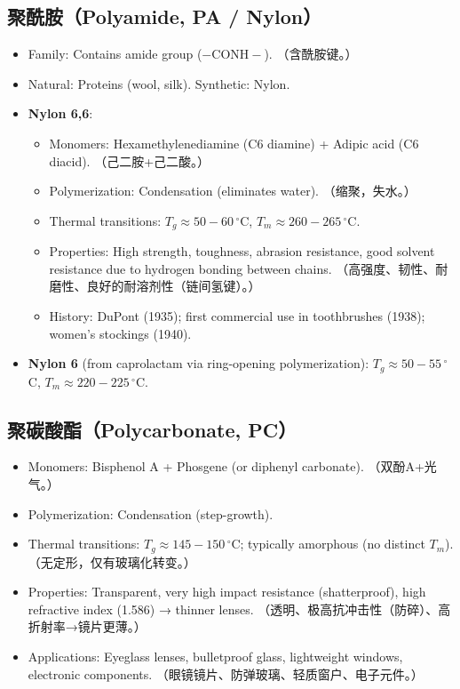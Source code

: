 \documentclass[12pt,a4paper]{ctexart}
\begin{document}
\subsection{聚酰胺（Polyamide, PA / Nylon）}
\begin{itemize}[leftmargin=*]
    \item Family: Contains amide group ($-\mathrm{CONH}-$). （含酰胺键。）
    \item Natural: Proteins (wool, silk).  Synthetic: Nylon.
    \item \textbf{Nylon 6,6}:
        \begin{itemize}
            \item Monomers: Hexamethylenediamine (C6 diamine) + Adipic acid (C6 diacid). （己二胺+己二酸。）
            \item Polymerization: Condensation (eliminates water). （缩聚，失水。）
            \item Thermal transitions: $T_g \approx 50-60\,^\circ$C, $T_m \approx 260-265\,^\circ$C.
            \item Properties: High strength, toughness, abrasion resistance, good solvent resistance due to hydrogen bonding between chains. （高强度、韧性、耐磨性、良好的耐溶剂性（链间氢键）。）
            \item History: DuPont (1935); first commercial use in toothbrushes (1938); women's stockings (1940).
        \end{itemize}
    \item \textbf{Nylon 6} (from caprolactam via ring-opening polymerization): $T_g \approx 50-55\,^\circ$C, $T_m \approx 220-225\,^\circ$C.
\end{itemize}

\subsection{聚碳酸酯（Polycarbonate, PC）}
\begin{itemize}[leftmargin=*]
    \item Monomers: Bisphenol A + Phosgene (or diphenyl carbonate). （双酚A+光气。）
    \item Polymerization: Condensation (step-growth).
    \item Thermal transitions: $T_g \approx 145-150\,^\circ$C; typically amorphous (no distinct $T_m$). （无定形，仅有玻璃化转变。）
    \item Properties: Transparent, very high impact resistance (shatterproof), high refractive index (1.586) → thinner lenses. （透明、极高抗冲击性（防碎）、高折射率→镜片更薄。）
    \item Applications: Eyeglass lenses, bulletproof glass, lightweight windows, electronic components. （眼镜镜片、防弹玻璃、轻质窗户、电子元件。）
\end{itemize}
\end{document}
